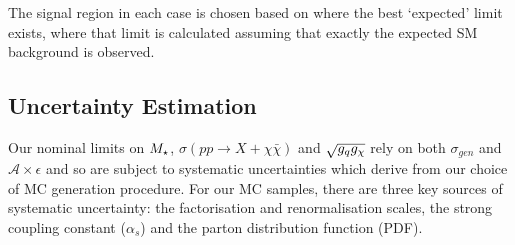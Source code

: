 The signal region in each case is chosen based on where the best `expected' limit exists, where that limit is calculated assuming that exactly the expected SM background is observed.





\subsection{Uncertainty Estimation}
Our nominal limits on $M_{\star}$, $\sigma(pp \rightarrow{X} + \chi\bar{\chi})$ and $\sqrt{g_q g_{\chi}}$ rely on both $\sigma_{gen}$ and $\mathcal{A}\times\epsilon$ and so are subject to systematic uncertainties which derive from our choice of MC generation procedure. For our MC samples, there are three key sources of systematic uncertainty: the factorisation and renormalisation scales, the strong coupling constant ($\alpha_{s}$) and the parton distribution function (PDF).

